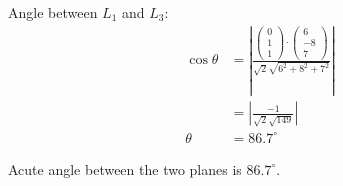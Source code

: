 \begin{enumerate}
Angle between $L_{1}$ and $L_{3}$: 
\begin{align*}
\cos\theta & =\left|\frac{\left(\begin{matrix}0\\
1\\
1
\end{matrix}\right)\cdot\left(\begin{matrix}6\\
-8\\
7
\end{matrix}\right)}{\sqrt{2}\sqrt{6^{2}+8^{2}+7^{2}}}\right|\\
 & =\left|\frac{-1}{\sqrt{2}\sqrt{149}}\right|\\
\theta & =86.7^{\circ}
\end{align*}

Acute angle between the two planes is $86.7^{\circ}$.
\end{enumerate}